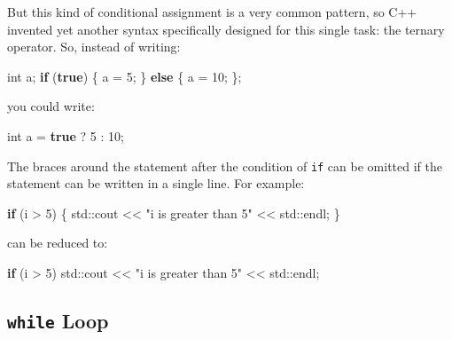 \documentclass[
]{book}
\newenvironment{Shaded}{\begin{snugshade}}{\end{snugshade}}
\newcommand{\BuiltInTok}[1]{#1}
\newcommand{\ControlFlowTok}[1]{\textcolor[rgb]{0.13,0.29,0.53}{\textbf{#1}}}
\newcommand{\DataTypeTok}[1]{\textcolor[rgb]{0.13,0.29,0.53}{#1}}
\newcommand{\DecValTok}[1]{\textcolor[rgb]{0.00,0.00,0.81}{#1}}
\newcommand{\KeywordTok}[1]{\textcolor[rgb]{0.13,0.29,0.53}{\textbf{#1}}}
\newcommand{\NormalTok}[1]{#1}
\newcommand{\StringTok}[1]{\textcolor[rgb]{0.31,0.60,0.02}{#1}}
\begin{document}
But this kind of conditional assignment is a very common pattern, so C++ invented yet another syntax specifically designed for this single task: the ternary operator. So, instead of writing:

\begin{Shaded}
\begin{Highlighting}[]
\DataTypeTok{int}\NormalTok{ a;}
\ControlFlowTok{if}\NormalTok{ (}\KeywordTok{true}\NormalTok{) \{ a = }\DecValTok{5}\NormalTok{; \} }\ControlFlowTok{else}\NormalTok{ \{ a = }\DecValTok{10}\NormalTok{; \};}
\end{Highlighting}
\end{Shaded}

you could write:

\begin{Shaded}
\begin{Highlighting}[]
\DataTypeTok{int}\NormalTok{ a = }\KeywordTok{true}\NormalTok{ ? }\DecValTok{5}\NormalTok{ : }\DecValTok{10}\NormalTok{;}
\end{Highlighting}
\end{Shaded}

The braces around the statement after the condition of \texttt{if} can be omitted if the statement can be written in a single line.
For example:

\begin{Shaded}
\begin{Highlighting}[]
\ControlFlowTok{if}\NormalTok{ (i \textgreater{} }\DecValTok{5}\NormalTok{) \{}
    \BuiltInTok{std::}\NormalTok{cout \textless{}\textless{} }\StringTok{"i is greater than 5"}\NormalTok{ \textless{}\textless{} }\BuiltInTok{std::}\NormalTok{endl;}
\NormalTok{\}}
\end{Highlighting}
\end{Shaded}

can be reduced to:

\begin{Shaded}
\begin{Highlighting}[]
\ControlFlowTok{if}\NormalTok{ (i \textgreater{} }\DecValTok{5}\NormalTok{)}
    \BuiltInTok{std::}\NormalTok{cout \textless{}\textless{} }\StringTok{"i is greater than 5"}\NormalTok{ \textless{}\textless{} }\BuiltInTok{std::}\NormalTok{endl;}
\end{Highlighting}
\end{Shaded}

\hypertarget{while-loop}{%
\subsection{\texorpdfstring{\texttt{while} Loop}{while Loop}}\label{while-loop}}
\end{document}
